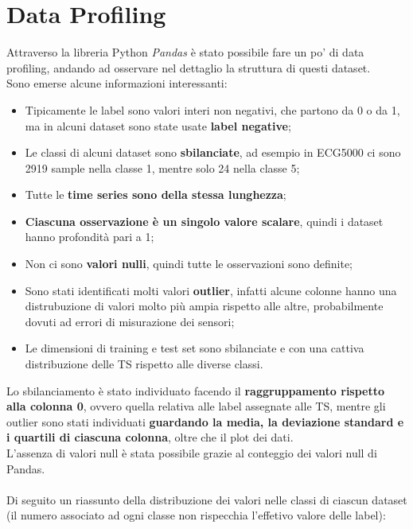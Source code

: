 \section{Data Profiling} \label{sec:profiling}
Attraverso la libreria Python \textit{Pandas} è stato possibile fare un po' di data profiling, andando ad osservare nel dettaglio la struttura di questi dataset.\\
Sono emerse alcune informazioni interessanti:
\begin{itemize}
	\item Tipicamente le label sono valori interi non negativi, che partono da 0 o da 1, ma in alcuni dataset sono state usate \textbf{label negative};
	\item Le classi di alcuni dataset sono \textbf{sbilanciate}, ad esempio in ECG5000 ci sono 2919 sample nella classe 1, mentre solo 24 nella classe 5;
	\item Tutte le \textbf{time series sono della stessa lunghezza};
	\item \textbf{Ciascuna osservazione è un singolo valore scalare}, quindi i dataset hanno profondità pari a 1;
	\item Non ci sono \textbf{valori nulli}, quindi tutte le osservazioni sono definite;
	\item Sono stati identificati molti valori \textbf{outlier}, infatti alcune colonne hanno una distrubuzione di valori molto più ampia rispetto alle altre, probabilmente dovuti ad errori di misurazione dei sensori;
	\item Le dimensioni di training e test set sono sbilanciate e con una cattiva distribuzione delle TS rispetto alle diverse classi.
\end{itemize}
Lo sbilanciamento è stato individuato facendo il \textbf{raggruppamento rispetto alla colonna 0}, ovvero quella relativa alle label assegnate alle TS, mentre gli outlier sono stati individuati \textbf{guardando la media, la deviazione standard e i quartili di ciascuna colonna}, oltre che il plot dei dati.\\
L'assenza di valori null è stata possibile grazie al conteggio dei valori null di Pandas.\\
\\
Di seguito un riassunto della distribuzione dei valori nelle classi di ciascun dataset (il numero associato ad ogni classe non rispecchia l'effetivo valore delle label):
